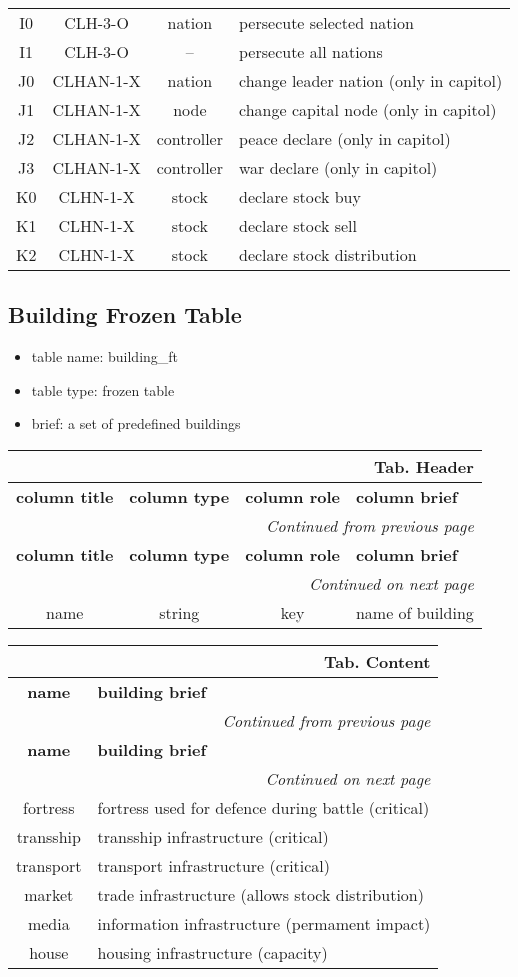 \documentclass[a4paper,oneside,titlepage]{report}
\newcommand*{\LTHeaderII}[3]{
  \multicolumn{2}{r}{\textbf{Tab. \thesubsection} \textbf{#1}}\\    
  \hline
  \textbf{#2} & \textbf{#3}\\
  \hline

  \endfirsthead
  \multicolumn{2}{r}{\textit{Continued from previous page}}\\    
  \hline
  \textbf{#2} & \textbf{#3}\\
  \hline
  \endhead
  \hline
  \multicolumn{2}{r}{\textit{Continued on next page}}\\
  \endfoot
  \hline
  \endlastfoot  
}
\newcommand*{\LTHeaderIV}[5]{
  \multicolumn{4}{r}{\textbf{Tab. \thesubsection} \textbf{#1}}\\    
  \hline
  \textbf{#2} & \textbf{#3} & \textbf{#4} & \textbf{#5}\\
  \hline
  
  \endfirsthead
  \multicolumn{4}{r}{\textit{Continued from previous page}}\\    
  \hline
  \textbf{#2} & \textbf{#3} & \textbf{#4} & \textbf{#5}\\
  \hline
  \endhead
  \hline
  \multicolumn{4}{r}{\textit{Continued on next page}}\\
  \endfoot
  \hline
  \endlastfoot  
}
\begin{document}
\begin{longtable}{ |c|c|c|l| }
  \hline
  I0 & CLH-3-O & nation & persecute selected nation\\
  I1 & CLH-3-O & --     & persecute all nations\\
  \hline
  J0 & CLHAN-1-X & nation     & change leader nation (only in capitol)\\
  J1 & CLHAN-1-X & node       & change capital node (only in capitol)\\
  J2 & CLHAN-1-X & controller & peace declare (only in capitol)\\
  J3 & CLHAN-1-X & controller & war declare (only in capitol)\\
  \hline
  K0 & CLHN-1-X & stock & declare stock buy\\
  K1 & CLHN-1-X & stock & declare stock sell\\
  K2 & CLHN-1-X  & stock & declare stock distribution\\
\end{longtable}

\subsection{Building Frozen Table}
\begin{itemize}
  \setlength{\itemsep}{0pt}
  \setlength{\parskip}{0pt}
\item table name: building\_ft  
\item table type: frozen table   
\item brief: a set of predefined buildings    
\end{itemize}

\vspace{-0.5cm}
\begin{longtable}{ |c|c|c|l| } 
  \LTHeaderIV{Header}{column title}{column type}{column role}{column brief}
  name & string & key & name of building\\
\end{longtable}        

\vspace{-0.5cm}
\begin{longtable}{ |c|l| }    
  \LTHeaderII{Content}{name}{building brief}                    
  fortress & fortress used for defence during battle (critical)\\
  transship & transship infrastructure (critical)\\
  transport & transport infrastructure (critical)\\
  market & trade infrastructure (allows stock distribution)\\
  media & information infrastructure (permament impact)\\
  house & housing infrastructure (capacity)\\
\end{longtable}
\end{document}
